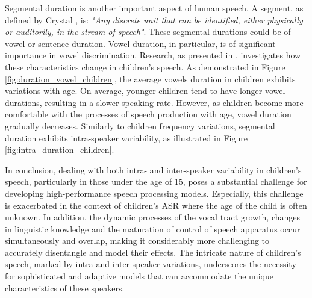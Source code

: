 Segmental duration is another important aspect of human speech. A segment, as defined by Crystal \cite{segment_definition}, is: \textit{"Any discrete unit that can be identified, either physically or auditorily, in the stream of speech"}. These segmental durations could be of vowel or sentence duration. Vowel duration, in particular, is of significant importance in vowel discrimination. Research, as presented in \cite{Acoustic_change_children}, investigates how these characteristics change in children's speech. As demonstrated in Figure \ref{fig:duration_vowel_children}, the average vowels duration in children exhibits variations with age. On average, younger children tend to have longer vowel durations, resulting in a slower speaking rate. However, as children become more comfortable with the processes of speech production with age, vowel duration gradually decreases. Similarly to children frequency variations, segmental duration exhibits intra-speaker variability, as illustrated in Figure \ref{fig:intra_duration_children}.


In conclusion, dealing with both intra- and inter-speaker variability in children's speech, particularly in those under the age of 15, poses a substantial challenge for developing high-performance speech processing models. Especially, this challenge is exacerbated in the context of children's \ac{ASR} where the age of the child is often unknown. In addition, the dynamic processes of the vocal tract growth, changes in linguistic knowledge and the maturation of control of speech apparatus occur simultaneously and overlap, making it considerably more challenging to accurately disentangle and model their effects. The intricate nature of children's speech, marked by intra and inter-speaker variations, underscores the necessity for sophisticated and adaptive models that can accommodate the unique characteristics of these speakers.



